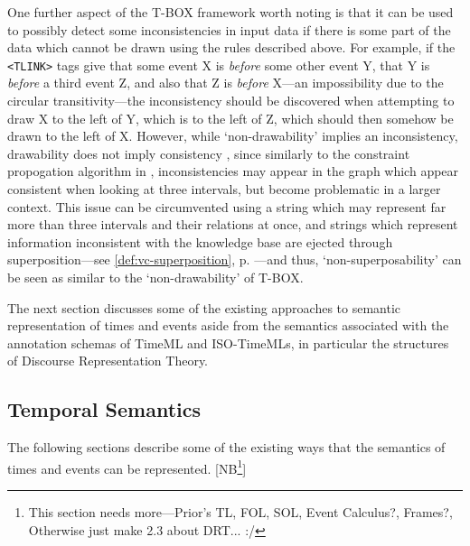 \documentclass[a4paper,12pt,leqno]{article}
\newcommand{\nb}[1]{{\color{red}[NB\footnote{{\color{red}#1}}]}}
\begin{document}
One further aspect of the T-BOX framework worth noting is that it can be used to possibly detect some inconsistencies in input data if there is some part of the data which cannot be drawn using the rules described above. For example, if the \verb|<TLINK>| tags give that some event X is \textit{before} some other event Y, that Y is \textit{before} a third event Z, and also that Z is \textit{before} X---an impossibility due to the circular transitivity---the inconsistency should be discovered when attempting to draw X to the left of Y, which is to the left of Z, which should then somehow be drawn to the left of X. However, while `non-drawability' implies an inconsistency, drawability does not imply consistency \citep[p. 12]{verhagen2005TBOX}, since similarly to the constraint propogation algorithm in \citet{allen1983maintaining}, inconsistencies may appear in the graph which appear consistent when looking at three intervals, but become problematic in a larger context. This issue can be circumvented using a string which may represent far more than three intervals and their relations at once, and strings which represent information inconsistent with the knowledge base are ejected through superposition---see \cref{def:vc-superposition}, p. \pageref{def:vc-superposition}---and thus, `non-superposability' can be seen as similar to the `non-drawability' of T-BOX.

The next section discusses some of the existing approaches to semantic representation of times and events aside from the semantics associated with the annotation schemas of TimeML and ISO-TimeMLs, in particular the structures of Discourse Representation Theory.

\subsection{Temporal Semantics}\label{sub:semantics}
The following sections describe some of the existing ways that the semantics of times and events can be represented.
\nb{This section needs more---Prior's TL, FOL, SOL, Event Calculus?, Frames?, Otherwise just make 2.3 about DRT... :/}
\end{document}
